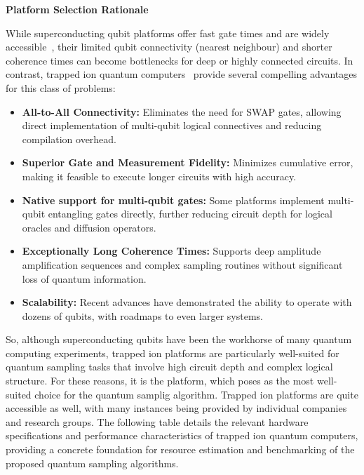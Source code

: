 \documentclass[encoding=utf8,british]{tumphthesis}
\begin{document}
    \vspace{1em}
    \noindent
    \textbf{Platform Selection Rationale}

    While superconducting qubit platforms offer fast gate times and are widely accessible~\cite{Huang_2020}, their limited qubit connectivity (nearest neighbour) 
    and shorter coherence times can become bottlenecks for deep or highly connected circuits. In contrast, trapped ion quantum computers~\cite{bernardini2023quantumcomputingtrappedions} 
    provide several compelling advantages for this class of problems:

    \begin{itemize}
        \item \textbf{All-to-All Connectivity:} Eliminates the need for SWAP gates, allowing direct implementation of multi-qubit 
        logical connectives and reducing compilation overhead.
        \item \textbf{Superior Gate and Measurement Fidelity:} Minimizes cumulative error, making it feasible to execute longer 
        circuits with high accuracy.
        \item \textbf{Native support for multi-qubit gates:} Some platforms implement multi-qubit entangling gates directly, 
        further reducing circuit depth for logical oracles and diffusion operators.
        \item \textbf{Exceptionally Long Coherence Times:} Supports deep amplitude amplification sequences and complex sampling 
        routines without significant loss of quantum information.
        \item \textbf{Scalability:} Recent advances have demonstrated the ability to operate with dozens of qubits, with roadmaps 
        to even larger systems.
    \end{itemize}

    So, although superconducting qubits have been the workhorse of many quantum computing experiments, trapped ion platforms are 
    particularly well-suited for quantum sampling tasks that involve high circuit depth and complex logical structure. 
    For these reasons, it is the platform, which poses as the most well-suited choice for the quantum samplig algorithm. Trapped ion 
    platforms are quite accessible as well, with many instances being provided by individual companies and research groups. The following 
    table details the relevant hardware specifications and performance characteristics of trapped ion quantum computers, providing a concrete foundation 
    for resource estimation and benchmarking of the proposed quantum sampling algorithms.
\end{document}
